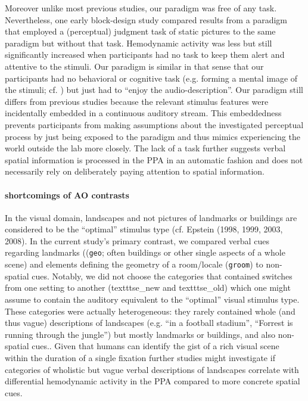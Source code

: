 \documentclass[english]{article}
\begin{document}
Moreover unlike most previous studies, our paradigm was free of any task.
%
Nevertheless, one early block-design study \citep{epstein1998ppa} compared
results from a paradigm that employed a (perceptual) judgment task of static
pictures to the same paradigm but without that task.
Hemodynamic activity was less but still significantly increased when
participants had no task to keep them alert and attentive to the stimuli.
Our paradigm is similar in that sense that our participants had no behavioral or
cognitive task (e.g. forming a mental image of the stimuli; cf.
\citep{ocraven2000mental})  but just had to ``enjoy the audio-description''.
Our paradigm still differs from previous studies because the relevant stimulus
features were incidentally embedded in a continuous auditory stream.
This embeddedness prevents participants from making assumptions about the
investigated perceptual process by just being exposed to the paradigm and thus
mimics experiencing the world outside the lab more closely.
The lack of a task further suggests verbal spatial information is processed in
the PPA in an automatic fashion and does not necessarily rely on deliberately
paying attention to spatial information.


\paragraph{shortcomings of AO contrasts}

In the visual domain, landscapes and not pictures of landmarks or buildings are
considered to be the ``optimal'' stimulus type (cf. Epstein (1998, 1999, 2003,
2008).
In the current study's primary contrast, we compared verbal cues regarding
landmarks ((\texttt{geo}; often buildings or other single aspects of a whole
scene) and elements defining the geometry of a room/locale (\texttt{groom}) to
non-spatial cues.
Notably, we did not choose the categories that contained switches from one
setting to another (texttt{se\_new} and texttt{se\_old}) which one might assume
to contain the auditory equivalent to the ``optimal'' visual stimulus type.
These categories were actually heterogeneous: they rarely contained whole (and
thus vague) descriptions of landscapes (e.g. ``in a football stadium'',
``Forrest is running through the jungle'') but mostly landmarks or buildings,
and also non-spatial cues..
Given that humans can identify the gist of a rich visual scene within the
duration of a single fixation \citep{henderson2003human} further studies might
investigate if categories of wholistic but vague verbal descriptions of
landscapes correlate with differential hemodynamic activity in the PPA compared
to more concrete spatial cues.
\end{document}
